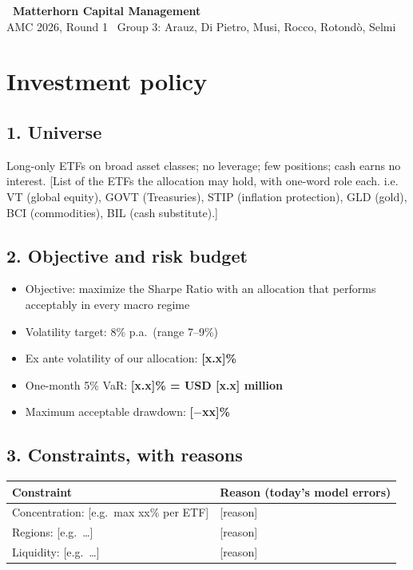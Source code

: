 \documentclass[11pt,a4paper]{article}
\newcommand{\todo}[1]{\textcolor{BrickRed}{[#1]}}
\begin{document}
\begin{center}
{\Large\bfseries \ Matterhorn Capital Management}\\[0.2em]
{\small AMC 2026, Round 1 \textbullet{} \ Group 3: Arauz, Di Pietro, Musi, Rocco, Rotondò, Selmi}
\end{center}



\newpage
\section*{Investment policy}

\subsection*{1. Universe}
Long-only ETFs on broad asset classes; no leverage; few positions; cash earns no interest.
\todo{List of the ETFs the allocation may hold, with one-word role each. i.e. VT (global equity), GOVT (Treasuries), STIP (inflation protection), GLD (gold), BCI (commodities), BIL (cash substitute).}

\subsection*{2. Objective and risk budget}
\begin{itemize}
  \item Objective: maximize the Sharpe Ratio with an allocation that performs acceptably
      in every macro regime 
  \item Volatility target: 8\% p.a.\ (range 7--9\%)
  \item Ex ante volatility of our allocation: \textbf{\todo{x.x}\%}
  \item One-month 5\% VaR: \textbf{\todo{x.x}\% = USD \todo{x.x} million}
  \item Maximum acceptable drawdown: \textbf{\todo{$-$xx}\%}
\end{itemize}

\subsection*{3. Constraints, with reasons}
\begin{tabularx}{\textwidth}{@{}p{}X@{}}
\toprule
Constraint & Reason (today's model errors) \\
\midrule
Concentration: \todo{e.g.\ max xx\% per ETF} & \todo{reason} \\
Regions: \todo{e.g.\ \ldots}                 & \todo{reason} \\
Liquidity: \todo{e.g.\ \ldots}               & \todo{reason} \\
\bottomrule
\end{tabularx}
\end{document}
